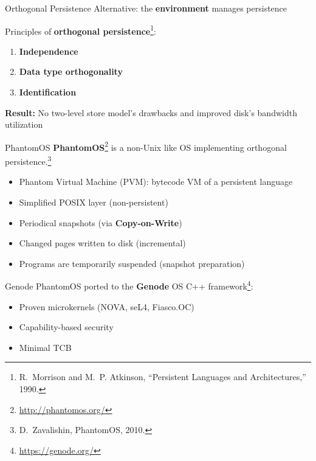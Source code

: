 \documentclass{beamer}
\begin{document}

\begin{frame}{Orthogonal Persistence}
    Alternative: the \textbf{environment} manages persistence

    \bigskip
    Principles of \textbf{orthogonal persistence}\footnote{R.~Morrison and M.~P. Atkinson, ``Persistent Languages and Architectures,'' 1990.}:
    \begin{enumerate}
        \item \textbf{Independence}
        \item \textbf{Data type orthogonality}
        \item \textbf{Identification}
    \end{enumerate}

    \bigskip
    \textbf{Result:} No two-level store model's drawbacks and improved disk's bandwidth utilization
\end{frame}


\begin{frame}{PhantomOS}
    \textbf{PhantomOS}\footnote{\url{http://phantomos.org/}} is a non-Unix like OS implementing orthogonal persistence.\footnote{D.~Zavalishin, PhantomOS, 2010.}

    \bigskip
    \begin{itemize}
        \item Phantom Virtual Machine (PVM): bytecode VM of a persistent language
        \item Simplified POSIX layer (non-persistent)
        \item Periodical snapshots (via \textbf{Copy-on-Write})
        \item Changed pages written to disk (incremental)
        \item Programs are temporarily suspended (snapshot preparation)
    \end{itemize}
\end{frame}


\begin{frame}{Genode}
    PhantomOS ported to the \textbf{Genode} OS C++ framework\footnote{\url{https://genode.org/}}:
    \begin{itemize}
        \item Proven microkernels (NOVA, seL4, Fiasco.OC)
        \item Capability-based security
        \item Minimal TCB
    \end{itemize}

    \bigskip
\end{frame}
\end{document}
